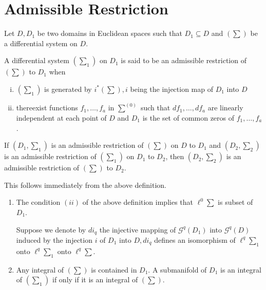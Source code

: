\section{Admissible Restriction}\label{chap3:sec3.4} %

Let $D, D_1$ be two domains in Euclidean spaces such that $D_1
\subseteq D$ and $(\sum)$ be a differential system on $D$. 

\begin{defi*}%
  A differential system $(\sum_1)$ on $D_1$ is said to be an
  admissible restriction of $(\sum)$ to $D_1$ when 
\end{defi*}

\begin{enumerate}[(i)]
\item $(\sum_1)$ is generated by $i^* (\sum), i$ being the injection
  map of $D_1$ into $D$ 
\item there\pageoriginale exist functions $f_1, \ldots , f_a$ in $\sum^{(0)}$ such
  that $df_1, \ldots , df_a$ are linearly independent at each point of
  $D$ and $D_1$ is the set of common zeros of $f_1, \ldots , f_a$. 
\end{enumerate}

\begin{proposition}\label{chap3:sec3.4:prop7} %
  If $(D_1, \sum_1)$ is an admissible restriction of $(\sum)$ on $D$
  to $D_1$ and $(D_2, \sum_2)$ is an admissible restriction of
  $(\sum_1)$ on $D_1$ to $D_2$, then $(D_2, \sum_2)$ is an admissible
  restriction of $(\sum)$ to $D_2$. 
\end{proposition}

This follows immediately from the above definition.

\begin{remarks*}%
\begin{enumerate}[\rm (1)]
\item The condition $(ii)$ of the above definition implies that
  $\ell^0 \sum$ is subset of $D_1$. 

  Suppose we denote by $di_q$ the injective mapping of
  $\mathscr{G}^q(D_1)$ into $\mathscr{G}^q(D)$ induced by the
  injection $i$ of $D_1$ into $D, di_q$ defines an isomorphism of
  $\ell^q \sum_1$ onto $\ell^q \sum_1$ onto $\ell^q \sum$. 
\item Any integral of $(\sum)$ is contained in $D_1$. A submanifold of
  $D_1$ is an integral of $(\sum_1)$ if only if it is an integral of
  $(\sum)$. 
\end{enumerate}
\end{remarks*}

